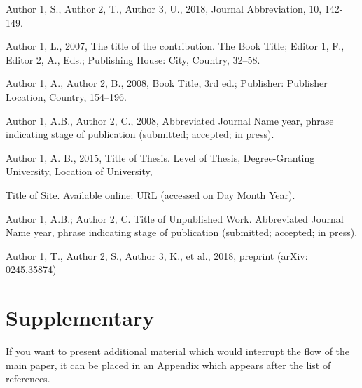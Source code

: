 \documentclass[referee,usenatbib]{ijmathtex}
\begin{document}
\begin{thebibliography}{}
Author 1, S., Author 2, T., Author 3, U., 2018, Journal Abbreviation, 10, 142-149. 

Author 1, L., 2007, The title of the contribution. The Book Title; Editor 1, F., Editor 2, A., Eds.; Publishing House: City, Country, 32–58.

Author 1, A., Author 2, B., 2008, Book Title, 3rd ed.; Publisher: Publisher Location, Country, 154–196.

Author 1, A.B., Author 2, C., 2008, Abbreviated Journal Name year, phrase indicating stage of publication (submitted; accepted; in press).

Author 1, A. B., 2015, Title of Thesis. Level of Thesis, Degree-Granting University, Location of University, 

Title of Site. Available online: URL (accessed on Day Month Year).

Author 1, A.B.; Author 2, C. Title of Unpublished Work. Abbreviated Journal Name year, phrase indicating stage of publication (submitted; accepted; in press).

Author 1, T., Author 2, S., Author 3, K., et al., 2018, preprint (arXiv: 0245.35874) 

\end{thebibliography}


\section*{Supplementary}
If you want to present additional material which would interrupt the ﬂow of the main paper, it can be placed in an Appendix which appears after the list of references.

\bsp	%
\label{lastpage}
\end{document}
